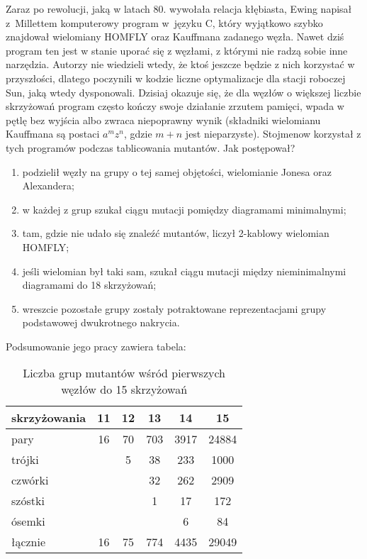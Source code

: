 Zaraz po rewolucji, jaką w latach 80. wywołała relacja kłębiasta, Ewing napisał z~Millettem komputerowy program w~języku C, który wyjątkowo szybko znajdował wielomiany HOMFLY oraz Kauffmana zadanego węzła.
Nawet dziś program ten jest w stanie uporać się z węzłami, z którymi nie radzą sobie inne narzędzia.
Autorzy nie wiedzieli wtedy, że ktoś jeszcze będzie z nich korzystać w przyszłości, dlatego poczynili w kodzie liczne optymalizacje dla stacji roboczej Sun, jaką wtedy dysponowali.
Dzisiaj okazuje się, że dla węzłów o większej liczbie skrzyżowań program często kończy swoje działanie zrzutem pamięci, wpada w pętlę bez wyjścia albo zwraca niepoprawny wynik (składniki wielomianu Kauffmana są postaci $a^m z^n$, gdzie $m + n$ jest nieparzyste).
Stojmenow korzystał z tych programów podczas tablicowania mutantów.
Jak postępował?
\begin{enumerate}
    \item podzielił węzły na grupy o tej samej objętości, wielomianie Jonesa oraz Alexandera;
    \item w każdej z grup szukał ciągu mutacji pomiędzy diagramami minimalnymi;
    \item tam, gdzie nie udało się znaleźć mutantów, liczył 2-kablowy wielomian HOMFLY;
    \item jeśli wielomian był taki sam, szukał ciągu mutacji między nieminimalnymi diagramami do 18 skrzyżowań;
    \item wreszcie pozostałe grupy zostały potraktowane reprezentacjami grupy podstawowej dwukrotnego nakrycia.
\end{enumerate}

Podsumowanie jego pracy zawiera tabela:

\begin{table}[h]
    \centering
    \begin{tabular}{lccccc} \toprule
        skrzyżowania & 11 & 12 & 13  & 14   & 15    \\ \midrule
        pary         & 16 & 70 & 703 & 3917 & 24884 \\
        trójki       &    & 5  & 38  & 233  & 1000  \\
        czwórki      &    &    & 32  & 262  & 2909  \\
        szóstki      &    &    & 1   & 17   & 172   \\
        ósemki       &    &    &     & 6    & 84    \\
        łącznie      & 16 & 75 & 774 & 4435 & 29049 \\
        \bottomrule
        \hline
    \end{tabular}
    \caption{Liczba grup mutantów wśród pierwszych węzłów do 15 skrzyżowań}
\end{table}

